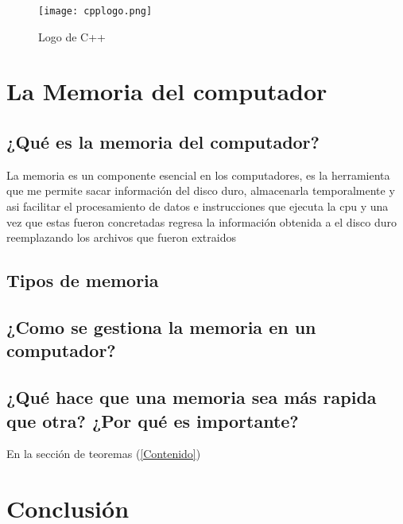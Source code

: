 \documentclass{article}
\begin{document}
\begin{figure}[h]
\texttt{[image: cpplogo.png]}
\centering
\caption{Logo de C++}
\label{fig:cpplogo}
\end{figure}
\section{La Memoria del computador}
\subsection{¿Qué es la memoria del computador?}
La memoria es un componente esencial en los computadores, es la herramienta que me permite sacar información del disco duro, almacenarla temporalmente y asi facilitar el procesamiento de datos e instrucciones que ejecuta la cpu y una vez que estas fueron concretadas regresa la información obtenida a el disco duro reemplazando los archivos que fueron extraidos
\subsection{Tipos de memoria}

\subsection{¿Como se gestiona la memoria en un computador?}
\subsection{¿Qué hace que una memoria sea más rapida que otra? ¿Por qué es importante?}

En la sección de teoremas (\ref{Contenido})

\section{Conclusión} \label{Conclusión}



\end{document}
